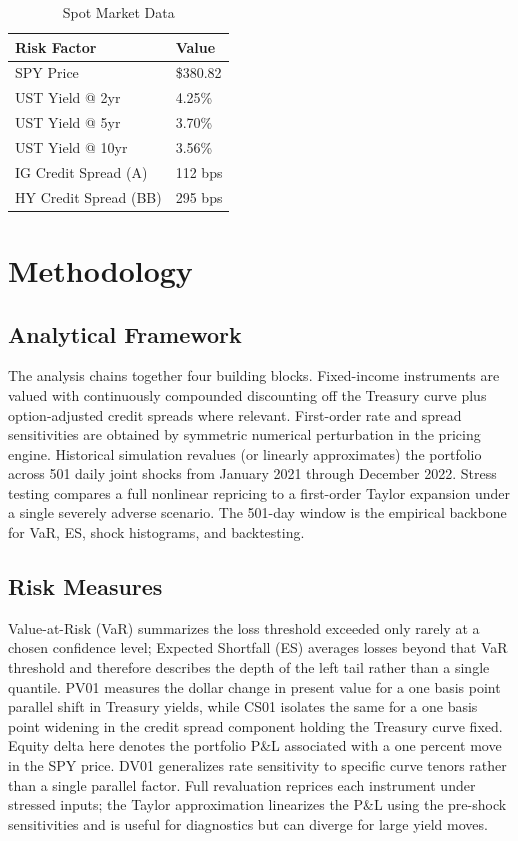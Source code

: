 \documentclass[11pt, a4paper]{article}
\begin{document}
\begin{table}[H]
\centering
\caption{Spot Market Data}
\begin{tabularx}{\textwidth}{lX}
\toprule
\textbf{Risk Factor} & \textbf{Value} \\
\midrule
SPY Price & \$380.82 \\
UST Yield @ 2yr & 4.25\% \\
UST Yield @ 5yr & 3.70\% \\
UST Yield @ 10yr & 3.56\% \\
IG Credit Spread (A) & 112 bps \\
HY Credit Spread (BB) & 295 bps \\
\bottomrule
\end{tabularx}
\end{table}

\section{Methodology}

\subsection{Analytical Framework}

The analysis chains together four building blocks. Fixed-income instruments are valued with continuously compounded discounting off the Treasury curve plus option-adjusted credit spreads where relevant. First-order rate and spread sensitivities are obtained by symmetric numerical perturbation in the pricing engine. Historical simulation revalues (or linearly approximates) the portfolio across 501 daily joint shocks from January 2021 through December 2022. Stress testing compares a full nonlinear repricing to a first-order Taylor expansion under a single severely adverse scenario. The 501-day window is the empirical backbone for VaR, ES, shock histograms, and backtesting.

\subsection{Risk Measures}

Value-at-Risk (VaR) summarizes the loss threshold exceeded only rarely at a chosen confidence level; Expected Shortfall (ES) averages losses beyond that VaR threshold and therefore describes the depth of the left tail rather than a single quantile. PV01 measures the dollar change in present value for a one basis point parallel shift in Treasury yields, while CS01 isolates the same for a one basis point widening in the credit spread component holding the Treasury curve fixed. Equity delta here denotes the portfolio P\&L associated with a one percent move in the SPY price. DV01 generalizes rate sensitivity to specific curve tenors rather than a single parallel factor. Full revaluation reprices each instrument under stressed inputs; the Taylor approximation linearizes the P\&L using the pre-shock sensitivities and is useful for diagnostics but can diverge for large yield moves.
\end{document}
